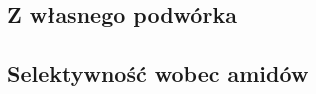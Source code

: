 \subsection{Z własnego podwórka}\label{literature:schwartz:our}
\subsection{Selektywność wobec amidów}\label{literature:schwartz:selecivity}

